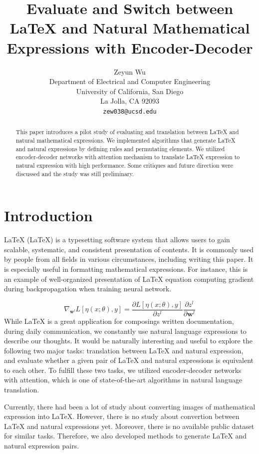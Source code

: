 \documentclass{article}
\title{Evaluate and Switch between LaTeX and Natural Mathematical Expressions with Encoder-Decoder}
\author{
    Zeyun Wu\\
    Department of Electrical and Computer Engineering \\
    University of California, San Diego \\
    La Jolla, CA 92093 \\
    \texttt{zew038@ucsd.edu}
}
\begin{document}
    
\maketitle

\begin{abstract}
This paper introduces a pilot study of evaluating and translation between LaTeX and natural mathematical expressions. We implemented algorithms that generate LaTeX and natural expressions by defining rules and permutating elements. We utilized encoder-decoder networks with attention mechanism to translate LaTeX expression to natural expression with high performance. Some critiques and future direction were discussed and the study was still preliminary. 
\end{abstract}

\section{Introduction}
LaTeX (\LaTeX) is a typesetting software system that allows users to gain scalable, systematic, and consistent presentation of contents. It is commonly used by people from all fields in various circumstances, including writing this paper. It is especially useful in formatting mathematical expressions. For instance, this is an example of well-organized presentation of LaTeX equation computing gradient during backpropagation when training neural network. \par 
\[ \nabla_{\mathbf{w}^l} L[\eta(x; \theta), y] = \frac{\partial L[\eta(x; \theta), y]}{\partial z^l} \frac{\partial z^l}{\partial \mathbf{w}^l} \]
While LaTeX is a great application for composings written documentation, during daily communication, we constantly use natural language expressions to describe our thoughts. It would be naturally interesting and useful to explore the following two major tasks: translation between LaTeX and natural expression, and evaluate whether a given pair of LaTeX and natural expressions is equivalent to each other. To fulfill these two tasks, we utilized encoder-decoder networks with attention, which is one of state-of-the-art algorithms in natural language translation. \par 
Currently, there had been a lot of study about converting images of mathematical expression into LaTeX. However, there is no study about convertion between LaTeX and natural expressions yet. Moreover, there is no available public dataset for similar tasks. Therefore, we also developed methods to generate LaTeX and natural expression pairs. 
% 
%
\end{document}
